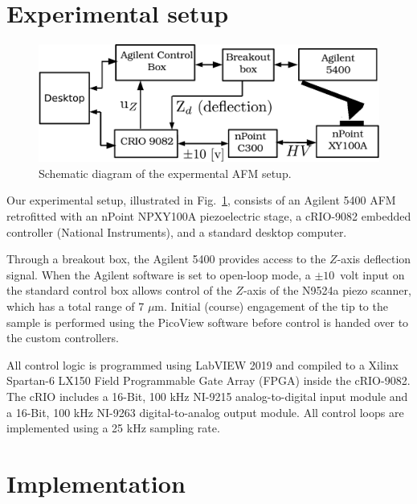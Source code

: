 \documentclass[twocolumn,oneside]{IEEEtran/IEEEtran}
\begin{document}
\section{Experimental setup} \label{sec:experimentalSetup}
\begin{figure}[ht!]
  \includegraphics[width=1\columnwidth]{figures/exp_setup.pdf}
  \caption{Schematic diagram of the expermental AFM setup.}
  \label{fig:exp_setup}
\end{figure}

Our experimental setup, illustrated in Fig.~\ref{fig:exp_setup},
consists of an Agilent 5400 AFM  retrofitted with an nPoint NPXY100A
piezoelectric stage, a cRIO-9082 embedded controller (National
Instruments), and a standard desktop computer. 

Through a breakout box, the Agilent 5400 provides access to the $Z$-axis deflection signal. When the Agilent software is set to open-loop mode, a $\pm10$~volt input on the standard control box allows control of the $Z$-axis of the N9524a piezo scanner, which has a total range of 7 $\mu$m.
Initial (course) engagement of the tip to the
sample is performed using the PicoView software before control is handed over to
the custom controllers.
	
All control logic is programmed using LabVIEW 2019 and compiled to a Xilinx
Spartan-6 LX150 Field Programmable Gate Array (FPGA) inside the cRIO-9082. The
cRIO includes a 16-Bit, 100 kHz NI-9215 analog-to-digital input module and a
16-Bit, 100 kHz NI-9263 digital-to-analog output module. All control loops are
implemented using a 25 kHz sampling rate.


\section{Implementation}\label{sec:implementation}
\end{document}
